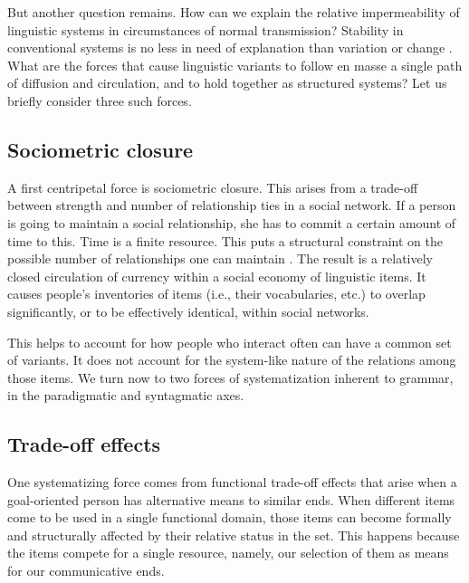 But another question remains. How can we explain the relative impermeability of linguistic systems in circumstances of normal transmission? Stability in conventional systems is no less in need of 
explanation than variation or change \citep{bourdieu_outline_1977,sperber_explaining_1996,sperber_cognitive_2004}. What are the forces that cause linguistic variants to follow en masse a single path of diffusion 
and circulation, and to hold together as structured systems? Let us briefly 
consider three such forces.



\subsection{Sociometric closure}
\label{sociometricclosure}


A first centripetal force is sociometric closure. This arises from a trade-off between strength and number of relationship ties in a 
social network. If a person is going to maintain a social relationship, she 
has to commit a certain amount of time to this. Time is a 
finite resource. This puts a structural constraint on the possible 
number of relationships one can maintain \citep{hill_social_2003}. 
The result is a relatively closed circulation of currency within a 
social economy of linguistic items. It causes people's inventories of 
items (i.e., their vocabularies, etc.) to overlap significantly, or to 
be effectively identical, within social networks.



This helps to account for how people who interact often
can have a common set of variants. It does not account for the 
system-like nature of the relations among those items. We 
turn now to two forces of systematization inherent 
to grammar, in the paradigmatic and syntagmatic axes.



\subsection{Trade-off effects}
\label{tradeoff}

One systematizing force comes from functional trade-off effects that 
arise when a goal-oriented person has alternative means to similar ends. When different items come to be used 
in a single functional domain, those items can become formally and 
structurally affected by their relative status in the set. This happens 
because the items compete for a single resource, namely, our selection of 
them as means for our communicative ends. 



